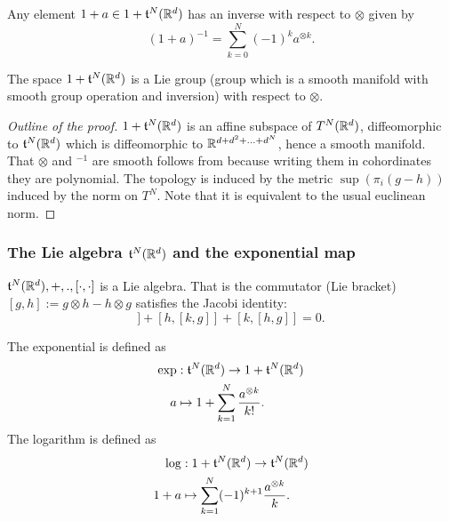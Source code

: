 \begin{lemma}
    Any element \(1 + a \in 1 + \mathfrak{t}^N(\mathbb{R}^d)\) has an inverse with respect to \(\otimes\) given by
    \begin{equation}
        (1 + a)^{-1} = \sum_{k=0}^{N} (-1)^{k} a^{\otimes k}.
    \end{equation}
\end{lemma}

\begin{proposition}
    The space \(1 + \mathfrak{t}^N(\mathbb{R}^d)\) is a Lie group (group which is a smooth manifold with smooth group operation and inversion) with respect to \(\otimes\).
\end{proposition}
\begin{proof}[Outline of the proof]
    \(1 + \mathfrak{t}^N(\mathbb{R}^d)\) is an affine subspace of \(T^N(\mathbb{R}^d)\), diffeomorphic to \(\mathfrak{t}^N(\mathbb{R}^d)\) which is diffeomorphic to \(\mathbb{R}^{d + d^2 + ... + d^N}\), hence a smooth manifold.
    That \(\otimes\) and \(^{-1}\) are smooth follows from because writing them in cohordinates they are polynomial.
    The topology is induced by the metric \(\sup(\pi_i(g - h))\) induced by the norm on \(T^N\).
    Note that it is equivalent to the usual euclinean norm.
\end{proof}

\subsubsection{The Lie algebra \(\mathfrak{t}^N(\mathbb{R}^d)\) and the exponential map}

\begin{proposition}
    \(\mathfrak{t}^N(\mathbb{R}^d), +, ., [\cdot, \cdot] \) is a Lie algebra.
    That is the commutator (Lie bracket) \([g,h] := g \otimes h - h \otimes g\) satisfies the Jacobi identity:
    \begin{equation}
        [g,[h,k]] + [h,[k,g]] + [k,[h,g]] = 0.
    \end{equation}
\end{proposition}

\begin{definition}
    The exponential is defined as
    \begin{align}
        \exp&: \mathfrak{t}^N(\mathbb{R}^d) \rightarrow 1 + \mathfrak{t}^N(\mathbb{R}^d) \\
        a &\mapsto 1 + \sum_{k=1}^N \frac{a^{\otimes k}}{k!}.
    \end{align}
    The logarithm is defined as
    \begin{align}
        \log&: 1 + \mathfrak{t}^N(\mathbb{R}^d) \rightarrow \mathfrak{t}^N(\mathbb{R}^d) \\
        1 + a &\mapsto \sum_{k=1}^N (-1)^{k+1} \frac{a^{\otimes k}}{k}.
    \end{align}
\end{definition}

